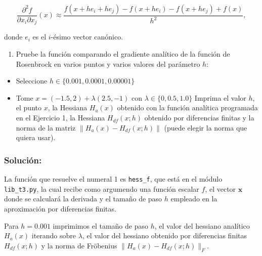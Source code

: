 \documentclass[11pt]{article}
\providecommand{\tightlist}{%
      \setlength{\itemsep}{0pt}\setlength{\parskip}{0pt}}
\begin{document}
\[ \frac{\partial^2 f}{\partial x_i \partial x_j}(x) \approx
\frac{f(x + he_i+he_j) - f(x+he_i)- f(x+he_j) + f(x)}{h^2}, \]

donde \(e_i\) es el \(i\)-ésimo vector canónico.

\begin{enumerate}
\def\labelenumi{\arabic{enumi}.}
\setcounter{enumi}{1}
\tightlist
\item
  Pruebe la función comparando el gradiente analítico de la función de
  Rosenbrock en varios puntos y varios valores del parámetro \(h\):
\end{enumerate}

\begin{itemize}
\tightlist
\item
  Seleccione \(h \in \{0.001, 0.0001, 0.00001 \}\)
\item
  Tome \(x = (-1.5,2) + \lambda (2.5,-1)\) con
  \(\lambda \in \{0, 0.5, 1.0\}\) Imprima el valor \(h\), el punto
  \(x\), la Hessiana \(H_{a}(x)\) obtenido con la función analítica
  programada en el Ejercicio 1, la Hessiana \(H_{df}(x;h)\) obtenido por
  diferencias finitas y la norma de la matriz
  \(\|H_{a}(x) - H_{df}(x;h)\|\) (puede elegir la norma que quiera
  usar).
\end{itemize}

\hypertarget{soluciuxf3n}{%
\subsubsection{Solución:}\label{soluciuxf3n}}

    La función que resuelve el numeral 1 es \texttt{hess\_f}, que está en el
módulo \texttt{lib\_t3.py}, la cual recibe como argumendo una función
escalar \(f\), el vector \(\mathbf{x}\) donde se calculará la derivada y
el tamaño de paso \(h\) empleado en la aproximación por diferencias
finitas.

Para \(h=0.001\) imprimimos el tamaño de paso \(h\), el valor del
hessiano analítico \(H_a(x)\) iterando sobre \(\lambda\), el valor del
hessiano obtenido por diferencias finitas \(H_{df}(x;h)\) y la norma de
Fröbenius \(\lVert H_a(x)-H_{df}(x;h) \rVert_F\).
\end{document}

